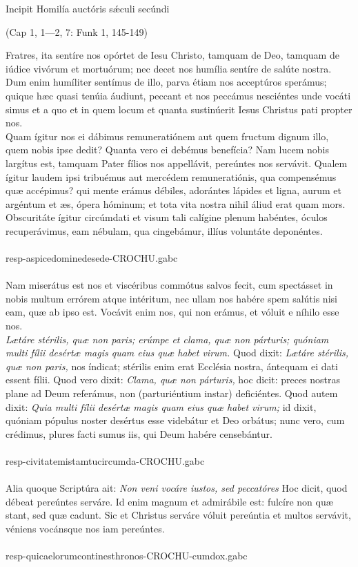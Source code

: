 \documentclass[options]{article}
\begin{document}
	Incipit Homilía auctóris s\'{æ}culi secúndi
	\begin{flushright}
		(Cap 1, 1—2, 7: Funk 1, 145-149)
		
	\end{flushright}
	Fratres, ita sentíre nos opórtet de Iesu Christo, tamquam de Deo, tamquam de iúdice vivórum et mortuórum; nec decet nos humília sentíre de salúte nostra. Dum enim humíliter sentímus de illo, parva étiam nos acceptúros sperámus; quique hæc quasi tenúia áudiunt, peccant et nos peccámus nesciéntes unde vocáti simus et a quo et in quem locum et quanta sustinúerit Iesus Christus pati propter nos. \\
	 Quam ígitur nos ei dábimus remuneratiónem aut quem fructum dignum illo, quem nobis ipse dedit? Quanta vero ei debémus benefícia? Nam lucem nobis largítus est, tamquam Pater fílios nos appellávit, pereúntes nos servávit. Qualem ígitur laudem ipsi tribuémus aut mercédem remuneratiónis, qua compensémus quæ accépimus? qui mente erámus débiles, adorántes lápides et ligna, aurum et argéntum et æs, ópera hóminum; et tota vita nostra nihil áliud erat quam mors. Obscuritáte ígitur circúmdati et visum tali calígine plenum habéntes, óculos recuperávimus, eam nébulam, qua cingebámur, illíus voluntáte deponéntes.\\
	 \\
	 resp-aspicedominedesede-CROCHU.gabc\\
	 \\
	   Nam miserátus est nos et viscéribus commótus salvos fecit, cum spectásset in nobis multum errórem atque intéritum, nec ullam nos habére spem salútis nisi eam, quæ ab ipso est. Vocávit enim nos, qui non erámus, et vóluit e níhilo esse nos. \\
	   \emph{Lætáre stérilis, quæ non paris; erúmpe et clama, quæ non párturis; quóniam multi fílii desértæ magis quam eius quæ habet virum.}
	   Quod dixit: \emph{Lætáre stérilis, quæ non paris,}
	    nos índicat; stérilis enim erat Ecclésia nostra, ántequam ei dati essent fílii. Quod vero dixit: 
	    \emph{Clama, quæ non párturis,}
	    hoc dicit: preces nostras plane ad Deum referámus, non (parturiéntium instar) deficiéntes. Quod autem dixit: 
	    \emph{Quia multi fílii desértæ magis quam eius quæ habet virum;}
	    id dixit, quóniam pópulus noster desértus esse videbátur et Deo orbátus; nunc vero, cum crédimus, plures facti sumus iis, qui Deum habére censebántur. \\
	    \\
	    resp-civitatemistamtucircumda-CROCHU.gabc\\
	    \\
	     Alia quoque Scriptúra ait: 
	    \emph{Non veni vocáre iustos, sed peccatóres}
	     Hoc dicit, quod débeat pereúntes serváre. Id enim magnum et admirábile est: fulcíre non quæ stant, sed quæ cadunt. Sic et Christus serváre vóluit pereúntia et multos servávit, véniens vocánsque nos iam pereúntes.\\
	     \\
	     resp-quicaelorumcontinesthronos-CROCHU-cumdox.gabc
	   
\end{document}
